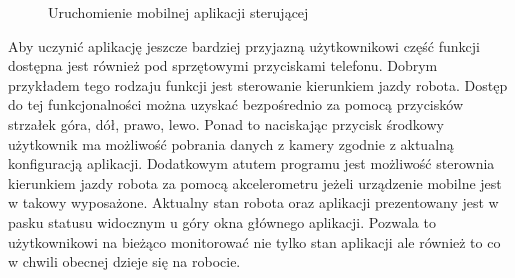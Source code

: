  \begin{figure}[h!]
 \centering
 \caption{Uruchomienie mobilnej aplikacji sterującej}
 \label{fig:wm-run}
\end{figure}

Aby uczynić aplikację jeszcze bardziej przyjazną użytkownikowi część funkcji
dostępna jest również pod sprzętowymi przyciskami telefonu. Dobrym przykładem
tego rodzaju funkcji jest sterowanie kierunkiem jazdy robota. Dostęp do tej
funkcjonalności można uzyskać bezpośrednio za pomocą przycisków strzałek
góra, dół, prawo, lewo. Ponad to naciskając przycisk środkowy użytkownik ma
możliwość pobrania danych z kamery zgodnie z aktualną konfiguracją aplikacji.
Dodatkowym atutem programu jest możliwość sterownia kierunkiem jazdy robota za
pomocą akcelerometru jeżeli urządzenie mobilne jest w takowy wyposażone.
Aktualny stan robota oraz aplikacji prezentowany jest w pasku statusu widocznym
u góry okna głównego aplikacji. Pozwala to użytkownikowi na bieżąco monitorować
nie tylko stan aplikacji ale również to co w chwili obecnej dzieje się na
robocie.
